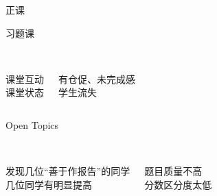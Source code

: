 
\begin{frame}
  \begin{center}
	\Huge{正课}
  \end{center}
\end{frame}

\begin{frame}
  \begin{center}
	\Huge{习题课}
  \end{center}

  \pause
  \begin{columns}
	  \begin{center}
		 \\[10pt]
		{\large 课堂互动} \\[8pt]
		{\large 课堂状态}
	  \end{center}
	\pause
	  \begin{center}
		 \\[10pt]
		{\large 有仓促、未完成感} \\[8pt]
		{\large 学生流失}
	  \end{center}
  \end{columns}
\end{frame}

\begin{frame}
  \begin{center}
	{\Huge Open Topics} \\[10pt] \pause
  \end{center}

  \pause
  \begin{columns}
	  \begin{center}
		 \\[10pt]
		{\large 发现几位``善于作报告''的同学} \\[8pt]
		{\large 几位同学有明显提高}
	  \end{center}
	\pause
	  \begin{center}
		 \\[10pt]
		{\large 题目质量不高} \\[8pt]
		{\large 分数区分度太低}
	  \end{center}
  \end{columns}

  \pause
  \vspace{0.60cm}
  \begin{center}
  \end{center}
\end{frame}

